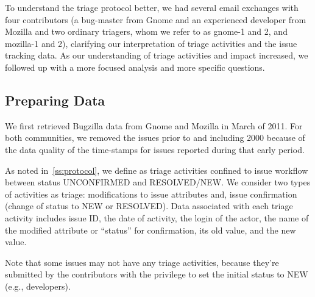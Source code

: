 \documentclass[conference]{IEEEtran}
\begin{document}
To understand the triage protocol better, we had several email
exchanges with four contributors (a bug-master from Gnome and an
experienced developer from Mozilla and two ordinary triagers, whom
we refer to as gnome-1 and 2, and mozilla-1 and 2), clarifying our
interpretation of triage activities and the issue tracking data. As
our understanding of triage activities and impact increased, we
followed up with a more focused analysis and more specific
questions.



\subsection{Preparing Data}\label{ss:collect}
We first retrieved Bugzilla data from Gnome and Mozilla in March of
2011.  For both communities, we removed the issues prior to and
including 2000 because of the data quality of the time-stamps for
issues reported during that early period.

As noted in~\ref{ss:protocol}, we define as triage activities
confined to issue workflow between status UNCONFIRMED and
RESOLVED/NEW. We consider two types of activities as triage:
modifications to issue attributes and, issue confirmation
(change of status to NEW or RESOLVED).
Data associated with each triage activity
includes issue ID, the date of activity, the
login of the actor, the name of the modified attribute or
``status'' for confirmation, its old value, and the new value.

Note that some issues may not have any triage activities,
because they're submitted by the contributors with the
privilege to set the initial status to NEW (e.g., developers).
\end{document}
